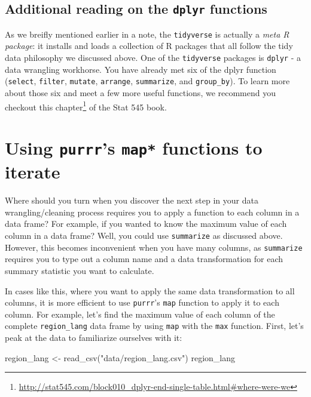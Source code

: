 \documentclass[
]{krantz}
\makeatletter
\newenvironment{Shaded}{\begin{snugshade}}{\end{snugshade}}
\newcommand{\FunctionTok}[1]{\textcolor[rgb]{0,0,0}{#1}}
\newcommand{\NormalTok}[1]{#1}
\newcommand{\OtherTok}[1]{\textcolor[rgb]{0.37,0.37,0.37}{#1}}
\newcommand{\StringTok}[1]{\textcolor[rgb]{0.5,0.5,0.5}{#1}}
\renewcommand{\href}[2]{#2\footnote{\url{#1}}}
\newenvironment{kframe}{%
\medskip{}
\setlength{\fboxsep}{.8em}
 \def\at@end@of@kframe{}%
 \ifinner\ifhmode%
  \def\at@end@of@kframe{\end{minipage}}%
  \begin{minipage}{\columnwidth}%
 \fi\fi%
 \def\FrameCommand##1{\hskip\@totalleftmargin \hskip-\fboxsep
 \colorbox{shadecolor}{##1}\hskip-\fboxsep
     \hskip-\linewidth \hskip-\@totalleftmargin \hskip\columnwidth}%
 \MakeFramed {\advance\hsize-\width
   \@totalleftmargin\z@ \linewidth\hsize
   \@setminipage}}%
 {\par\unskip\endMakeFramed%
 \at@end@of@kframe}
\renewenvironment{Shaded}{\begin{kframe}}{\end{kframe}}
\makeatother
\begin{document}
\hypertarget{additional-reading-on-the-dplyr-functions}{%
\subsection{\texorpdfstring{Additional reading on the \texttt{dplyr} functions}{Additional reading on the dplyr functions}}\label{additional-reading-on-the-dplyr-functions}}

As we breifly mentioned earlier in a note, the \texttt{tidyverse} is actually a \emph{meta R package}: it installs and loads a collection of R packages that all follow
the tidy data philosophy we discussed above. One of the \texttt{tidyverse} packages is \texttt{dplyr} - a data wrangling workhorse. You have already met six of
the dplyr function (\texttt{select}, \texttt{filter}, \texttt{mutate}, \texttt{arrange}, \texttt{summarize}, and \texttt{group\_by}). To learn more about those six and meet a few more
useful functions, we recommend you checkout \href{http://stat545.com/block010_dplyr-end-single-table.html\#where-were-we}{this chapter} of the Stat 545 book.

\hypertarget{using-purrrs-map-functions-to-iterate}{%
\section{\texorpdfstring{Using \texttt{purrr}'s \texttt{map*} functions to iterate}{Using purrr's map* functions to iterate}}\label{using-purrrs-map-functions-to-iterate}}

Where should you turn when you discover the next step in your data wrangling/cleaning process requires you to apply a function to
each column in a data frame? For example, if you wanted to know the maximum value of each column in a data frame? Well, you could use \texttt{summarize}
as discussed above. However, this becomes inconvenient when you have many columns, as \texttt{summarize} requires you to type out a column name and a data
transformation for each summary statistic you want to calculate.

In cases like this, where you want to apply the same data transformation to all columns, it is more efficient to use \texttt{purrr}'s \texttt{map} function to
apply it to each column. For example, let's find the maximum value of each column of the complete \texttt{region\_lang} data frame by using \texttt{map} with the \texttt{max} function. First, let's peak at the data to familiarize ourselves with it:

\begin{Shaded}
\begin{Highlighting}[]
\NormalTok{region\_lang }\OtherTok{\textless{}{-}} \FunctionTok{read\_csv}\NormalTok{(}\StringTok{"data/region\_lang.csv"}\NormalTok{)}
\NormalTok{region\_lang}
\end{Highlighting}
\end{Shaded}
\end{document}
